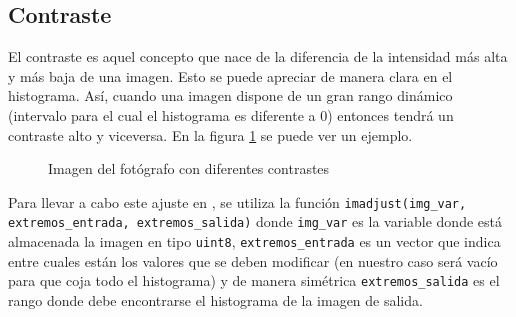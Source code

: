 \documentclass[main]{subfiles}
\begin{document}
\subsection{Contraste}
El contraste es aquel concepto que nace de la diferencia de la intensidad más alta y más baja de una imagen. Esto se puede apreciar de manera clara en el histograma. Así, cuando una imagen dispone de un gran rango dinámico (intervalo para el cual el histograma es diferente a 0) entonces tendrá un contraste alto y viceversa. En la figura \ref{fig:contraste} se puede ver un ejemplo.
\begin{figure}
\centering
    \quad
    \quad
    \caption{Imagen del fotógrafo con diferentes contrastes\label{fig:contraste}}
\end{figure}

Para llevar a cabo este ajuste en \MATLAB, se utiliza la función \texttt{imadjust(img_var, extremos_entrada, extremos_salida)} %
donde \texttt{img_var} es la variable donde está almacenada la imagen en tipo \texttt{uint8}, \texttt{extremos_entrada} es un vector que indica entre cuales están los valores que se deben modificar (en nuestro caso será vacío para que coja todo el histograma) y de manera simétrica \texttt{extremos_salida} es el rango donde debe encontrarse el histograma de la imagen de salida.
\end{document}
